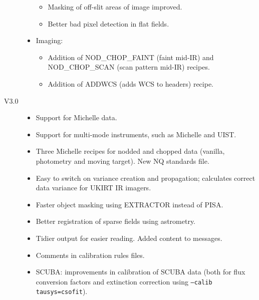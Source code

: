 \documentclass[twoside,11pt,nolof]{starlink}
\begin{document}
\begin{description}
\begin{itemize}
\begin{itemize}
\item Masking of off-slit areas of image improved.

\item Better bad pixel detection in flat fields.

\end{itemize}

\item Imaging:

\begin{itemize}

\item Addition of NOD\_CHOP\_FAINT (faint mid-IR) and
    NOD\_CHOP\_SCAN (scan pattern mid-IR) recipes.

\item Addition of ADDWCS (adds WCS to headers) recipe.

\end{itemize}

\end{itemize}

\item[V3.0]

\begin{itemize}

\item Support for Michelle data.

\item Support for multi-mode instruments, such as Michelle and UIST.

\item Three Michelle recipes for nodded and chopped data (vanilla,
  photometry and moving target).  New NQ standards file.

\item Easy to switch on variance creation and propagation; calculates
  correct data variance for UKIRT IR imagers.

\item  Faster object masking using EXTRACTOR instead of PISA.

\item Better registration of sparse fields using astrometry.

\item Tidier output for easier reading.  Added content to messages.

\item Comments in calibration rules files.

\item SCUBA: improvements in calibration of SCUBA data (both for flux
    conversion factors and extinction correction using
     \texttt{--calib tausys=csofit}).


\end{itemize}
\end{description}
\end{document}
